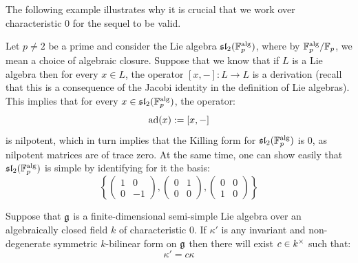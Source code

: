         \begin{example}
            The following example illustrates why it is crucial that we work over characteristic $0$ for the sequel to be valid.

            Let $p \not = 2$ be a prime and consider the Lie algebra $\mathfrak{sl}_2(\mathbb{F}_p^{\mathrm{alg}})$, where by $\mathbb{F}_p^{\mathrm{alg}}/\mathbb{F}_p$, we mean a choice of algebraic closure. Suppose that we know that if $L$ is a Lie algebra then for every $x \in L$, the operator $[x, -]: L \to L$ is a derivation (recall that this is a consequence of the Jacobi identity in the definition of Lie algebras). This implies that for every $x \in \mathfrak{sl}_2(\mathbb{F}_p^{\mathrm{alg}})$, the operator:
                $$\mathrm{ad}(x) := [x, -]$$
            is nilpotent, which in turn implies that the Killing form for $\mathfrak{sl}_2(\mathbb{F}_p^{\mathrm{alg}})$ is $0$, as nilpotent matrices are of trace zero. At the same time, one can show easily that $\mathfrak{sl}_2(\mathbb{F}_p^{\mathrm{alg}})$ is simple by identifying for it the basis:
                $$\left\{ \begin{pmatrix} 1 & 0 \\ 0 & -1 \end{pmatrix}, \begin{pmatrix} 0 & 1 \\ 0 & 0 \end{pmatrix}, \begin{pmatrix} 0 & 0 \\ 1 & 0 \end{pmatrix} \right\}$$
        \end{example}
        \begin{proposition} \label{prop: killing_form_uniqueness}
            Suppose that $\mathfrak{g}$ is a finite-dimensional semi-simple Lie algebra over an algebraically closed field $k$ of characteristic $0$. If $\kappa'$ is any invariant and non-degenerate symmetric $k$-bilinear form on $\mathfrak{g}$ then there will exist $c \in k^{\x}$ such that:
                $$\kappa' = c \kappa$$
        \end{proposition}

